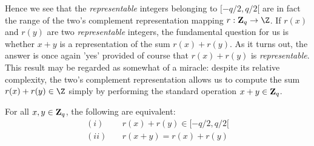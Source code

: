 \documentclass{article}
\newcommand{\zq}{\mbox{${\bf Z}_{q}$}}
\begin{document}
Hence we see that the {\em representable} integers belonging to $[-q/2,q/2[$
are in fact the range of the two's complement representation mapping
$r:\zq\rightarrow\Z$. If $r(x)$ and $r(y)$ are two {\em representable} 
integers, the fundamental question for us is whether $x+y$ is a 
representation of the sum $r(x)+r(y)$. As it turns out, the answer is once 
again 'yes' provided of course that $r(x)+r(y)$ is {\em representable}. 
This result may be regarded as somewhat of a miracle: despite its relative
complexity, the two's complement representation allows us to compute 
the sum $r(x)+r(y)\in\Z$ simply by 
performing the standard operation $x+y\in\zq$. 
\begin{prop}\label{carry:signed:add:morphism}
  For all $x,y\in\zq$, the following are equivalent:
    \begin{eqnarray*}
      (i)&\ &r(x)+r(y)\in[-q/2,q/2[\\
      (ii)&\ &r(x+y)=r(x)+r(y)
    \end{eqnarray*}
\end{prop}
\end{document}
